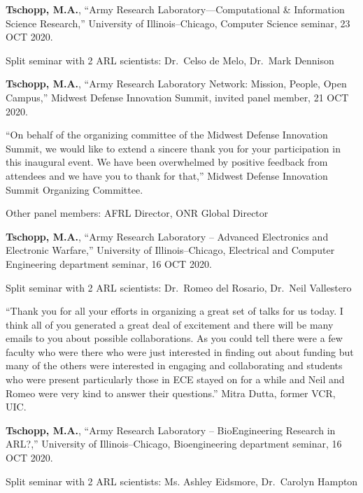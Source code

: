 \begin{cvlist}
\item
\textbf{Tschopp, M.A.}, ``Army Research Laboratory---Computational \& Information Science Research,'' University of Illinois--Chicago, Computer Science seminar, 23 OCT 2020.
\begin{list2}
\item[$\star$] Split seminar with 2 ARL scientists: Dr.~Celso de Melo, Dr.~Mark Dennison
\end{list2}

\item
\textbf{Tschopp, M.A.}, ``Army Research Laboratory Network: Mission, People, Open Campus,'' Midwest Defense Innovation Summit, invited panel member, 21 OCT 2020.
\begin{list2}
\item[$\star$] ``On behalf of the organizing committee of the Midwest Defense Innovation Summit, we would like to extend a sincere thank you for your participation in this inaugural event. We have been overwhelmed by positive feedback from attendees and we have you to thank for that,'' Midwest Defense Innovation Summit Organizing Committee.
\item[$\star$] Other panel members: AFRL Director, ONR Global Director
\end{list2}

\item
\textbf{Tschopp, M.A.}, ``Army Research Laboratory -- Advanced Electronics and Electronic Warfare,'' University of Illinois--Chicago, Electrical and Computer Engineering department seminar, 16 OCT 2020.
\begin{list2}
\item[$\star$] Split seminar with 2 ARL scientists: Dr.~Romeo del Rosario, Dr.~Neil Vallestero
\item[$\star$] ``Thank you for all your efforts in organizing a great set of talks for us today. I think all of you generated a great deal of excitement and there will be many emails to you about possible collaborations. As you could tell there were a few faculty who were there who were just interested in finding out about funding but many of the others were interested in engaging and collaborating and students who were present particularly those in ECE stayed on for a while and Neil and Romeo were very kind to answer their questions.''  Mitra Dutta, former VCR, UIC.
\end{list2}

\item
\textbf{Tschopp, M.A.}, ``Army Research Laboratory -- BioEngineering Research in ARL?,'' University of Illinois--Chicago, Bioengineering department seminar, 16 OCT 2020.
\begin{list2}
\item[$\star$] Split seminar with 2 ARL scientists: Ms. Ashley Eidsmore, Dr.~Carolyn Hampton 
\end{list2}


\end{cvlist}
